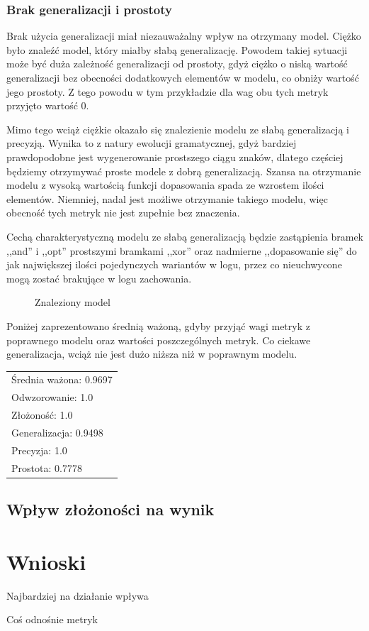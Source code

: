 \subsubsection{Brak generalizacji i prostoty}
Brak użycia generalizacji miał niezauważalny wpływ na otrzymany model. Ciężko było znaleźć model, który miałby słabą generalizację. Powodem takiej sytuacji może być duża zależność generalizacji od prostoty, gdyż ciężko o niską wartość generalizacji bez obecności dodatkowych elementów w modelu, co obniży wartość jego prostoty. Z tego powodu w tym przykładzie dla wag obu tych metryk przyjęto wartość 0.

Mimo tego wciąż ciężkie okazało się znalezienie modelu ze słabą generalizacją i precyzją. Wynika to z natury ewolucji gramatycznej, gdyż bardziej prawdopodobne jest wygenerowanie prostszego ciągu znaków, dlatego częściej będziemy otrzymywać proste modele z dobrą generalizacją. Szansa na otrzymanie modelu z wysoką wartością funkcji dopasowania spada ze wzrostem ilości elementów. Niemniej, nadal jest możliwe otrzymanie takiego modelu, więc obecność tych metryk nie jest zupełnie bez znaczenia.

Cechą charakterystyczną modelu ze słabą generalizacją będzie zastąpienia bramek ,,and'' i ,,opt'' prostszymi bramkami ,,xor'' oraz nadmierne ,,dopasowanie się'' do jak największej ilości pojedynczych wariantów w logu, przez co nieuchwycone mogą zostać brakujące w logu zachowania.

\begin{figure}[H]
	\caption{\label{fig:flow_chart}Znaleziony model}
\end{figure}

Poniżej zaprezentowano średnią ważoną, gdyby przyjąć wagi metryk z poprawnego modelu  oraz wartości poszczególnych metryk. Co ciekawe generalizacja, wciąż nie jest dużo niższa niż w poprawnym modelu.
 
 \begin{center}
  \begin{tabular}{l}
	Średnia ważona: 0.9697 \\
	Odwzorowanie: 1.0 \\
	Złożoność: 1.0 \\
	Generalizacja: 0.9498 \\
	Precyzja: 1.0 \\
	Prostota: 0.7778
  \end{tabular}
 \end{center}

\subsection{Wpływ złożoności na wynik}

\section{Wnioski}
Najbardziej na działanie wpływa

Coś odnośnie metryk
